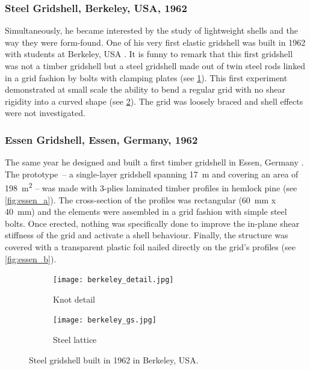 
\subsubsection{Steel Gridshell, Berkeley, USA, 1962}
Simultaneously, he became interested by the study of lightweight shells and the way they were form-found. One of his very first elastic gridshell was built in 1962 with students at Berkeley, USA \cite[p.~270]{IL10}. It is funny to remark that this first gridshell was not a timber gridshell but a steel gridshell made out of twin steel rods linked in a grid fashion by bolts with clamping plates (see \cref{fig:berkeley_a}). This first experiment demonstrated at small scale the ability to bend a regular grid with no shear rigidity into a curved shape  (see \cref{fig:berkeley_b}). The grid was loosely braced and shell effects were not investigated.

\subsubsection{Essen Gridshell, Essen, Germany, 1962}
The same year he designed and built a first timber gridshell in Essen, Germany \cite[p.~272]{IL10}. The prototype~-- a single-layer gridshell spanning \SI{17}{m} and covering an area of \SI{198}{m^2} -- was made with 3-plies laminated timber profiles in hemlock pine (see \cref{fig:essen_a}). The cross-section of the profiles was rectangular (\SI{60}{mm} x \SI{40}{mm}) and the elements were assembled in a grid fashion with simple steel bolts. Once erected, nothing was specifically done to improve the in-plane shear stiffness of the grid and activate a shell behaviour. Finally, the structure was covered with a transparent plastic foil nailed directly on the grid's profiles (see \cref{fig:essen_b}).

\begin{figure}[t]
	\begin{subfigure}[b]{\TwoMediaWidth}
		\texttt{[image: berkeley\_detail.jpg]}
		\caption{Knot detail}
		\label{fig:berkeley_a}
	\end{subfigure}%
	\hspace{\MediaGutterWidth}%
	\begin{subfigure}[b]{\TwoMediaWidth}
		\texttt{[image: berkeley\_gs.jpg]}
		\caption{Steel lattice}
		\label{fig:berkeley_b}
	\end{subfigure}
	\caption[Steel gridshell built in 1962 in Berkeley, USA]{Steel gridshell built in 1962 in Berkeley, USA.}
	\label{fig:berkeley}
\end{figure}

